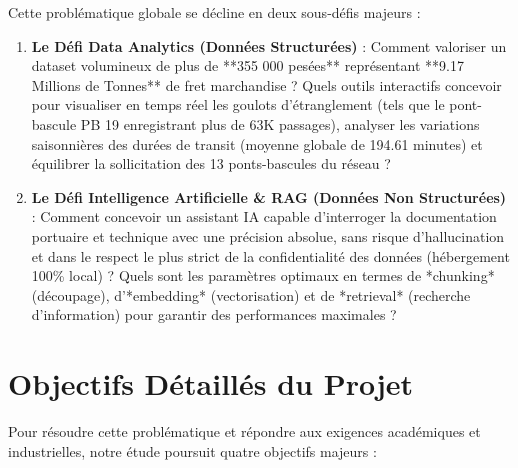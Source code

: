\documentclass[12pt,a4paper,oneside]{report}
\begin{document}
Cette problématique globale se décline en deux sous-défis majeurs :
\begin{enumerate}
    \item \textbf{Le Défi Data Analytics (Données Structurées)} : Comment valoriser un dataset volumineux de plus de **355 000 pesées** représentant **9.17 Millions de Tonnes** de fret marchandise ? Quels outils interactifs concevoir pour visualiser en temps réel les goulots d'étranglement (tels que le pont-bascule PB 19 enregistrant plus de 63K passages), analyser les variations saisonnières des durées de transit (moyenne globale de 194.61 minutes) et équilibrer la sollicitation des 13 ponts-bascules du réseau ?
    \item \textbf{Le Défi Intelligence Artificielle \& RAG (Données Non Structurées)} : Comment concevoir un assistant IA capable d'interroger la documentation portuaire et technique avec une précision absolue, sans risque d'hallucination et dans le respect le plus strict de la confidentialité des données (hébergement 100\% local) ? Quels sont les paramètres optimaux en termes de *chunking* (découpage), d'*embedding* (vectorisation) et de *retrieval* (recherche d'information) pour garantir des performances maximales ?
\end{enumerate}

\section*{Objectifs Détaillés du Projet}
Pour résoudre cette problématique et répondre aux exigences académiques et industrielles, notre étude poursuit quatre objectifs majeurs :
\end{document}
